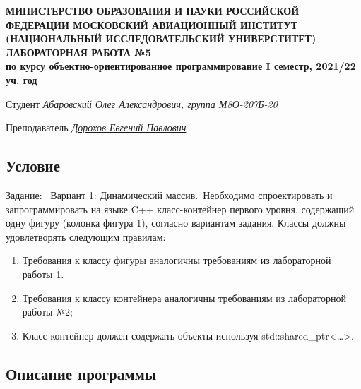 \documentclass[12pt]{article}
\begin{document}
\begin{titlepage}
\begin{center}
\textbf{МИНИСТЕРСТВО ОБРАЗОВАНИЯ И НАУКИ РОССИЙСКОЙ ФЕДЕРАЦИИ
\medskip
МОСКОВСКИЙ АВИАЦИОННЫЙ ИНСТИТУТ
(НАЦИОНАЛЬНЫЙ ИССЛЕДОВАТЕЛЬСКИЙ УНИВЕРСТИТЕТ)
\vfill\vfill
{\Huge ЛАБОРАТОРНАЯ РАБОТА №5} \\
по курсу объектно-ориентированное программирование
I семестр, 2021/22 уч. год}
\end{center}
\vfill

Студент \uline{\it {Абаровский Олег Александрович, группа М8О-207Б-20}\hfill}

Преподаватель \uline{\it {Дорохов Евгений Павлович}\hfill}

\vfill
\end{titlepage}

\subsection*{Условие}

Задание: \
Вариант 1: Динамический массив.\
Необходимо спроектировать и запрограммировать на языке C++ класс-контейнер первого уровня, содержащий одну фигуру (колонка фигура 1), согласно вариантам задания. Классы должны удовлетворять следующим правилам:
\begin{enumerate}
\item Требования к классу фигуры аналогичны требованиям из лабораторной работы 1.
\item Требования к классу контейнера аналогичны требованиям из лабораторной работы №2;
\item Класс-контейнер должен содержать объекты используя std::shared\_ptr<…>.
\end{enumerate}

\subsection*{Описание программы}
\end{document}
